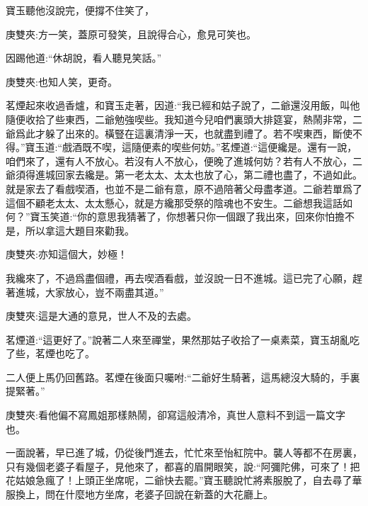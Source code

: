 \begin{parag}
    寶玉聽他沒說完，便撐不住笑了，\begin{note}庚雙夾:方一笑，蓋原可發笑，且說得合心，愈見可笑也。\end{note}因踢他道:“休胡說，看人聽見笑話。”\begin{note}庚雙夾:也知人笑，更奇。\end{note}茗煙起來收過香爐，和寶玉走著，因道:“我已經和姑子說了，二爺還沒用飯，叫他隨便收拾了些東西，二爺勉強喫些。我知道今兒咱們裏頭大排筵宴，熱鬧非常，二爺爲此才躲了出來的。橫豎在這裏清淨一天，也就盡到禮了。若不喫東西，斷使不得。”寶玉道:“戲酒既不喫，這隨便素的喫些何妨。”茗煙道:“這便纔是。還有一說，咱們來了，還有人不放心。若沒有人不放心，便晚了進城何妨？若有人不放心，二爺須得進城回家去纔是。第一老太太、太太也放了心，第二禮也盡了，不過如此。就是家去了看戲喫酒，也並不是二爺有意，原不過陪著父母盡孝道。二爺若單爲了這個不顧老太太、太太懸心，就是方纔那受祭的陰魂也不安生。二爺想我這話如何？”寶玉笑道:“你的意思我猜著了，你想著只你一個跟了我出來，回來你怕擔不是，所以拿這大題目來勸我。\begin{note}庚雙夾:亦知這個大，妙極！\end{note}我纔來了，不過爲盡個禮，再去喫酒看戲，並沒說一日不進城。這已完了心願，趕著進城，大家放心，豈不兩盡其道。”\begin{note}庚雙夾:這是大通的意見，世人不及的去處。\end{note}茗煙道:“這更好了。”說著二人來至禪堂，果然那姑子收拾了一桌素菜，寶玉胡亂吃了些，茗煙也吃了。
\end{parag}


\begin{parag}
    二人便上馬仍回舊路。茗煙在後面只囑咐:“二爺好生騎著，這馬總沒大騎的，手裏提緊著。”\begin{note}庚雙夾:看他偏不寫鳳姐那樣熱鬧，卻寫這般清冷，真世人意料不到這一篇文字也。\end{note}一面說著，早已進了城，仍從後門進去，忙忙來至怡紅院中。襲人等都不在房裏，只有幾個老婆子看屋子，見他來了，都喜的眉開眼笑，說:“阿彌陀佛，可來了！把花姑娘急瘋了！上頭正坐席呢，二爺快去罷。”寶玉聽說忙將素服脫了，自去尋了華服換上，問在什麼地方坐席，老婆子回說在新蓋的大花廳上。
\end{parag}


